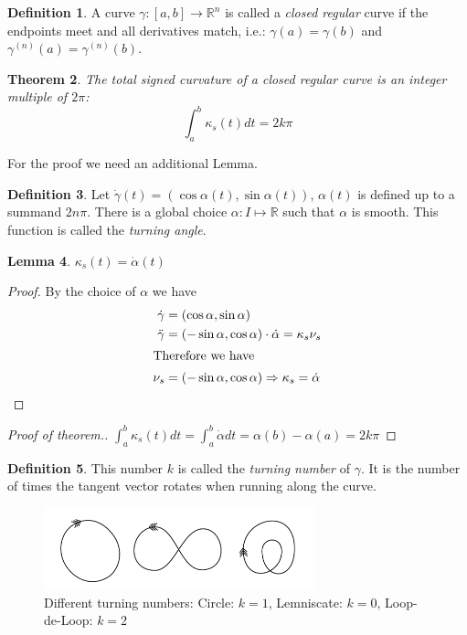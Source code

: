 \documentclass[a4paper,11pt,notitlepage,fullpage]{paper}
\newcommand{\dy}{\dot\gamma}
\newcommand{\ddy}{\ddot\gamma}
\theoremstyle{plain}
\newtheorem{thm}{Theorem}[section] %
\newtheorem{lem}[thm]{Lemma}
\theoremstyle{definition}
\newtheorem{defn}[thm]{Definition} %
\begin{document}
\begin{defn}
A curve $\gamma : [a,b] \to \mathbb R^n$ is called a \emph{closed regular} curve if the endpoints meet and all derivatives match, i.e.: $\gamma(a) = \gamma(b)$ and $\gamma^{(n)}(a) = \gamma^{(n)}(b)$.
\end{defn}

\begin{thm}
The total signed curvature of a closed regular curve is an integer multiple of $2\pi$:
\begin{equation*}
\int_a^b \kappa_s(t) dt = 2k\pi
\end{equation*}
\end{thm}

For the proof we need an additional Lemma.

\begin{defn}
Let $\dy(t) = (\cos\alpha(t), \sin\alpha(t))$, $\alpha(t)$ is defined up to a summand $2n\pi$. There is a global choice $\alpha: I \mapsto \mathbb R$ such that $\alpha$ is smooth. This function is called the \emph{turning angle}.
\end{defn}

\begin{lem}
$\kappa_s(t) = \dot\alpha(t)$
\end{lem}

\begin{proof}
By the choice of $\alpha$ we have
\begin{align*}
\dy &= (\cos \alpha, \sin \alpha)\\
\ddy &= (-\sin\alpha, \cos\alpha) \cdot \dot\alpha=\kappa_s \nu_s\\
\intertext{Therefore we have}
\nu_s &= (-\sin \alpha, \cos \alpha) \Rightarrow \kappa_s = \dot\alpha \qedhere
\end{align*}
\end{proof}

\begin{proof}[Proof of theorem.]
$\int_a^b \kappa_s(t) dt = \int_a^b \dot\alpha dt = \alpha(b) - \alpha(a) = 2k\pi$
\end{proof}

\begin{defn}
This number $k$ is called the \emph{turning number} of $\gamma$. It is the number of times the tangent vector rotates when running along the curve.
\end{defn}

\begin{figure}[H]
\centering
\includegraphics[width = 0.7\textwidth]{img/turning-number-examples}
\caption{Different turning numbers: Circle: $k=1$, Lemniscate: $k=0$, Loop-de-Loop: $k=2$}
\label{fig:turning-number-examples}
\end{figure}
\end{document}
